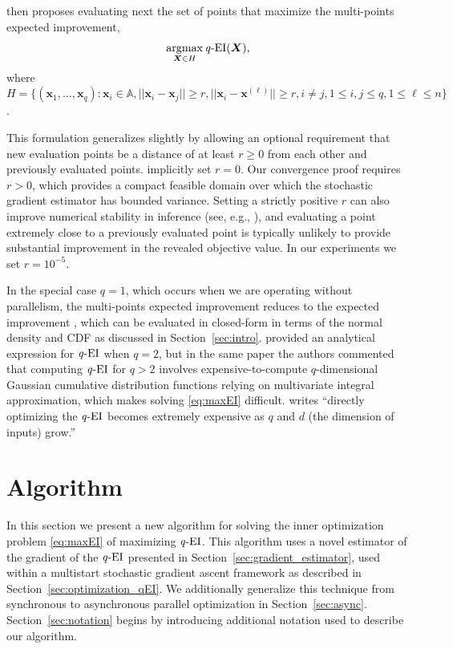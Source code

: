 \documentclass[paper=letter]{scrartcl}
\newcommand{\argmax}{\operatornamewithlimits{argmax}}
\newcommand{\qEI}{\text{\textit q-EI}}
\begin{document}
\cite{GiLeCa08} then proposes evaluating next the set of 
points that maximize the multi-points expected improvement, 
\begin{equation} 
  \argmax_{\bm{X} \in H} \qEI (\bm{X}),
  \label{eq:maxEI}
\end{equation}
where $H = \{(\bm{x}_1, \ldots, \bm{x}_q) : \bm{x}_i \in \mathbb{A}, \lvert\lvert \bm{x}_i - \bm{x}_j \rvert\rvert \geq r, \lvert\lvert \bm{x}_i - \bm{x}^{(\ell)} \rvert\rvert \geq r, i \neq j, 1 \leq i,j \leq q,  1 \leq \ell \leq n\}$.

This formulation generalizes \cite{GiLeCa08} slightly by allowing an optional requirement that new evaluation points be a distance of at least $r\ge0$ from each other and previously evaluated points.
\cite{GiLeCa08} implicitly set $r=0$.
  Our convergence proof requires $r>0$, which provides a compact feasible domain over which the stochastic gradient estimator has bounded variance.  Setting a strictly positive $r$ can also improve numerical stability in inference (see, e.g., \citealt{ababou1994condition}), and evaluating a point extremely close to a previously evaluated point is typically unlikely to provide substantial improvement in the revealed objective value.
In our experiments we set $r=10^{-5}$.

In the special case $q=1$, which occurs when we are operating without parallelism, 
the multi-points expected improvement reduces to the expected improvement 
\citep{mockus1989bayesian,JoScWe98}, which can be evaluated in closed-form in terms 
of the normal density and CDF as discussed in Section~\ref{sec:intro}. 
\cite{GiLeCa08} provided an analytical expression for $\qEI$ when $q=2$, but in the same paper the authors
commented that computing $\qEI$ for $q>2$ involves 
expensive-to-compute $q$-dimensional Gaussian cumulative distribution functions relying on multivariate integral approximation, which makes solving \eqref{eq:maxEI} difficult.  
\cite{Ginsbourger2009} writes \enquote{directly optimizing the $\qEI$ becomes extremely expensive 
as $q$ and $d$ (the dimension of inputs) grow.}

\section{Algorithm} \label{sec:algorithm}
In this section we present a new algorithm for solving the inner optimization problem  \eqref{eq:maxEI} of maximizing $\qEI$. 
This algorithm uses a novel estimator of the gradient of the $\qEI$ presented in Section~\ref{sec:gradient_estimator},
used within a multistart stochastic gradient ascent framework as described in  Section~\ref{sec:optimization_qEI}.
We additionally generalize this technique from synchronous to asynchronous parallel optimization in Section~\ref{sec:async}. 
Section~\ref{sec:notation} begins by introducing additional notation used to describe our algorithm.
\end{document}
